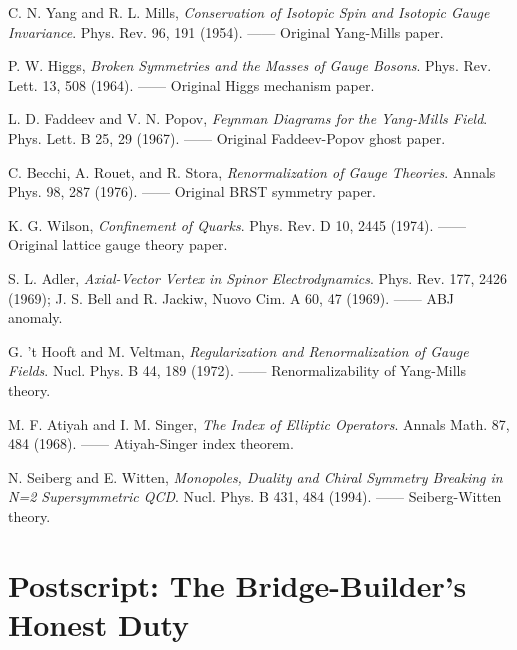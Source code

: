 \documentclass[12pt,a4paper]{article}
\theoremstyle{remark}
\begin{document}
\begin{enumerate}[label={[P\arabic*]}]
    \item C. N. Yang and R. L. Mills, \textit{Conservation of Isotopic Spin and Isotopic Gauge Invariance}.
    Phys. Rev. 96, 191 (1954). —— Original Yang-Mills paper.

    \item P. W. Higgs, \textit{Broken Symmetries and the Masses of Gauge Bosons}.
    Phys. Rev. Lett. 13, 508 (1964). —— Original Higgs mechanism paper.

    \item L. D. Faddeev and V. N. Popov, \textit{Feynman Diagrams for the Yang-Mills Field}.
    Phys. Lett. B 25, 29 (1967). —— Original Faddeev-Popov ghost paper.

    \item C. Becchi, A. Rouet, and R. Stora, \textit{Renormalization of Gauge Theories}.
    Annals Phys. 98, 287 (1976). —— Original BRST symmetry paper.

    \item K. G. Wilson, \textit{Confinement of Quarks}.
    Phys. Rev. D 10, 2445 (1974). —— Original lattice gauge theory paper.

    \item S. L. Adler, \textit{Axial-Vector Vertex in Spinor Electrodynamics}.
    Phys. Rev. 177, 2426 (1969); J. S. Bell and R. Jackiw,
    Nuovo Cim. A 60, 47 (1969). —— ABJ anomaly.

    \item G. 't Hooft and M. Veltman, \textit{Regularization and Renormalization of Gauge Fields}.
    Nucl. Phys. B 44, 189 (1972). —— Renormalizability of Yang-Mills theory.

    \item M. F. Atiyah and I. M. Singer, \textit{The Index of Elliptic Operators}.
    Annals Math. 87, 484 (1968). —— Atiyah-Singer index theorem.

    \item N. Seiberg and E. Witten, \textit{Monopoles, Duality and Chiral Symmetry Breaking in N=2 Supersymmetric QCD}.
    Nucl. Phys. B 431, 484 (1994). —— Seiberg-Witten theory.
\end{enumerate}

\newpage

\section*{Postscript: The Bridge-Builder's Honest Duty}
\end{document}
